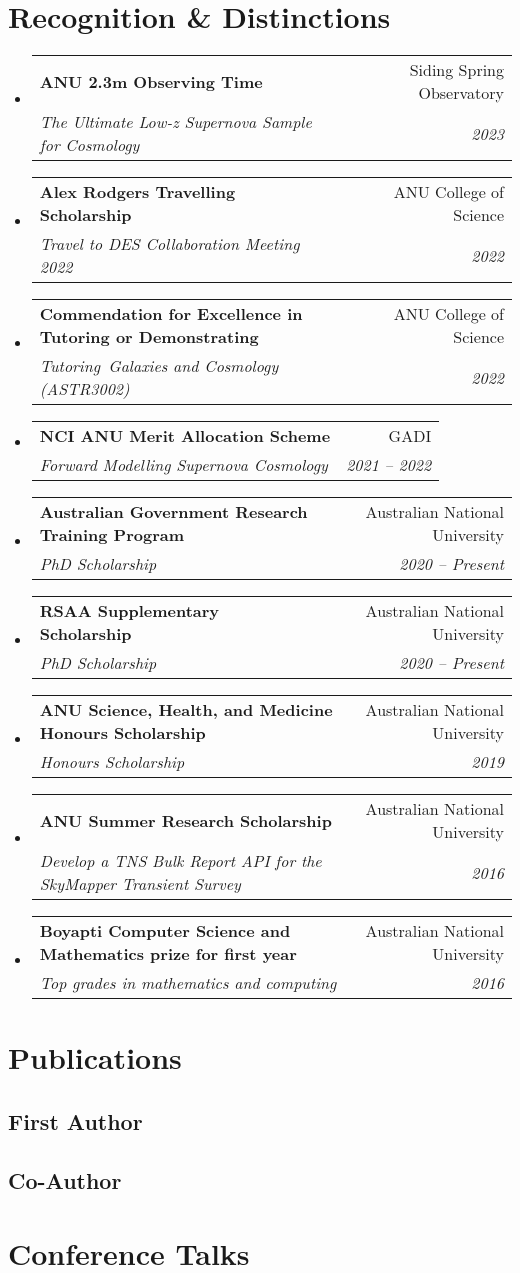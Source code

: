 \documentclass[letterpaper,11pt]{article}
\makeatletter
\newcommand{\resumeItem}[1]{
  \item\small{
    {#1 \vspace{-2pt}}
  }
}
\newcommand{\resumeSubheading}[4]{
  \vspace{-2pt}\item
    \begin{tabular*}{0.97\textwidth}[t]{l@{\extracolsep{\fill}}r}
      \textbf{#1} & #2 \\
      \textit{\small#3} & \textit{\small #4} \\
    \end{tabular*}\vspace{-7pt}
}
\newcommand{\resumeSubHeadingListStart}{\begin{itemize}[leftmargin=0.15in, label={}]}
\newcommand{\resumeSubHeadingListEnd}{\end{itemize}}
\newcommand{\resumeItemListStart}{\begin{itemize}}
\newcommand{\resumeItemListEnd}{\end{itemize}\vspace{-5pt}}
\newcommand{\awardElement}[5]{%
    \resumeSubHeadingListStart
        \resumeSubheading
            {#1}
            {#2}
            {#3}
            {#4}
            \ifthenelse{\isempty{#5}}{}{%
                \resumeItemListStart
                    \renewcommand*{\do}[1]{\resumeItem{##1}}
                    \docsvlist{#5}%
                \resumeItemListEnd
            }%
    \resumeSubHeadingListEnd
}
\makeatother
\begin{document}
\section{Recognition \& Distinctions}

    \awardElement{ANU 2.3m Observing Time}{Siding Spring Observatory}{The Ultimate Low-z Supernova Sample for Cosmology}{2023}{}

    \awardElement{Alex Rodgers Travelling Scholarship}{ANU College of Science}{Travel to DES Collaboration Meeting 2022}{2022}{}
    
    \awardElement{Commendation for Excellence in Tutoring or Demonstrating}{ANU College of Science}{Tutoring~\textit{Galaxies and Cosmology (ASTR3002)}}{2022}{}

    \awardElement{NCI ANU Merit Allocation Scheme}{GADI}{Forward Modelling Supernova Cosmology}{2021 -- 2022}{}
    
    \awardElement{Australian Government Research Training Program}{Australian National University}{PhD Scholarship}{2020 -- Present}{}
    
    \awardElement{RSAA Supplementary Scholarship}{Australian National University}{PhD Scholarship}{2020 -- Present}{}
    
    \awardElement{ANU Science, Health, and Medicine Honours Scholarship}{Australian National University}{Honours Scholarship}{2019}{}
    
    \awardElement{ANU Summer Research Scholarship}{Australian National University}{Develop a TNS Bulk Report API for the SkyMapper Transient Survey}{2016}{}
    
    \awardElement{Boyapti Computer Science and Mathematics prize for first year}{Australian National University}{Top grades in mathematics and computing}{2016}{}

\section{Publications}

    \subsection{First Author}

    \subsection{Co-Author}

\section{Conference Talks}
\end{document}
